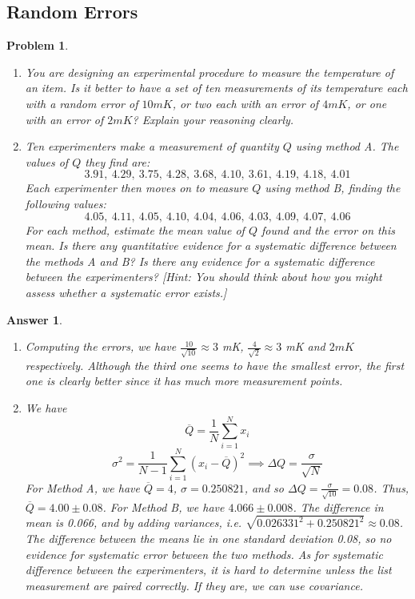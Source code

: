 \documentclass[a4paper]{article}
\newtheorem{ans}{Answer}[section]
\theoremstyle{new}
\newtheorem{qns}{Problem}[section]
\begin{document}
\subsection{Random Errors}
\begin{qns}\leavevmode
\begin{enumerate}[label=(\alph*)]
\item You are designing an experimental procedure to measure the temperature of an item. Is it better to have a set of ten measurements of its temperature each with a random error of $10mK$, or two each with an error of $4 mK$, or one with an error of $2 mK$? Explain your reasoning clearly.
\item Ten experimenters make a measurement of quantity $Q$ using method A. The values of $Q$ they find are:
$$3.91,~4.29,~3.75,~4.28,~3.68,~4.10,~3.61,~4.19,~4.18,~4.01$$
Each experimenter then moves on to measure $Q$ using method B, finding the following values:
$$4.05,~4.11,~4.05,~4.10,~4.04,~4.06,~4.03,~4.09,~4.07,~4.06$$
For each method, estimate the mean value of $Q$ found and the error on this mean. Is there any quantitative evidence for a systematic difference between the methods A and B? Is there any evidence for a systematic difference between the experimenters? [Hint: You should think about how you might assess whether a systematic error exists.]
\end{enumerate}
\end{qns}
\begin{ans}\leavevmode
\begin{enumerate}[label=(\alph*)]
\item Computing the errors, we have $\frac{10}{\sqrt{10}}\approx 3$ mK, $\frac{4}{\sqrt{2}}\approx 3$ mK and $2mK$ respectively. Although the third one seems to have the smallest error, the first one is clearly better since it has much more measurement points.
\item We have
$$\overline{Q}=\frac{1}{N}\sum_{i=1}^Nx_i$$
$$\sigma^2=\frac{1}{N-1}\sum_{i=1}^N(x_i-\overline{Q})^2\implies\Delta Q=\frac{\sigma}{\sqrt{N}}$$
For Method A, we have
$\overline{Q}=4$, $\sigma=0.250821$, and so $\Delta Q=\frac{\sigma}{\sqrt{10}}=0.08$. Thus, $\overline{Q}=4.00\pm0.08$. For Method B, we have $4.066\pm0.008$. The difference in mean is 0.066, and by adding variances, i.e. $\sqrt{0.026331^2+0.250821^2}\approx0.08$. The difference between the means lie in one standard deviation 0.08, so no evidence for systematic error between the two methods. As for systematic difference between the experimenters, it is hard to determine unless the list measurement are paired correctly. If they are, we can use covariance.
\end{enumerate}
\end{ans}
\end{document}
